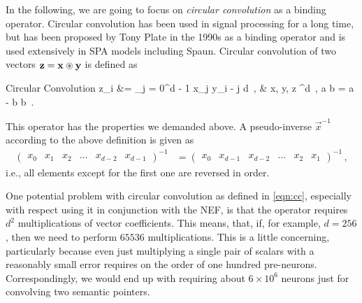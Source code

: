 \documentclass[10pt,letterpaper,oneside]{article}
\begin{document}
In the following, we are going to focus on \emph{circular convolution} as a binding operator. Circular convolution has been used in signal processing for a long time, but has been proposed by Tony Plate in the 1990s as a binding operator \cite{plate1995holographic} and is used extensively in SPA models including Spaun. Circular convolution of two vectors ${\mathbf{z}} = {\mathbf{x}} \circledast {\mathbf{y}}$ is defined as
\begin{ImportantEqn}{Circular Convolution}
	z_i &= \sum_{j = 0}^{d - 1} x_{j} y_{i - j \hspace{-1.25mm} \mod d } \,, &  \vec x, \vec y, \vec z \in {}^d \,,  a \hspace{-2mm} \mod b = a - b \left\lfloor {}b \right\rfloor \,.
	\label{eqn:cc}
\end{ImportantEqn}
This operator has the properties we demanded above. A pseudo-inverse $\vec x^{-1}$ according to the above definition is given as
\begin{align*}
 	\begin{pmatrix} x_0 & x_1 & x_2 & \hdots & x_{d - 2} & x_{d - 1} \end{pmatrix}^{-1} &= \begin{pmatrix} x_0 & x_{d-1} & x_{d-2} & \hdots & x_2 & x_1 \end{pmatrix}^{-1} \,,
\end{align*}
i.e., all elements except for the first one are reversed in order.


One potential problem with circular convolution as defined in \cref{eqn:cc}, especially with respect using it in conjunction with the NEF, is that the operator requires $d^2$ multiplications of vector coefficients. This means, that, if, for example, $d = 256$, then we need to perform $65536$ multiplications. This is a little concerning, particularly because even just multiplying a single pair of scalars with a reasonably small error requires on the order of one hundred pre-neurons. Correspondingly, we would end up with requiring about $6\times10^6$ neurons just for convolving two semantic pointers.
\end{document}
